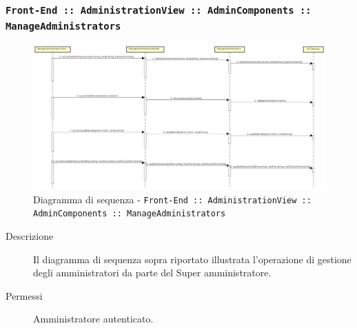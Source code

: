 \documentclass[../DefinizioneDiProdotto.tex]{subfiles}
\begin{document}
		\subsubsection{\texttt{Front-End :: AdministrationView :: AdminComponents :: ManageAdministrators}}
		\begin{figure}[!h]
			\centering
			\includegraphics[width=\textwidth]{DiagrammiSequenza/Front-End/AdministrationView/ManageAdministrators.png}
			\caption{Diagramma di sequenza - \texttt{Front-End :: AdministrationView :: AdminComponents :: ManageAdministrators }}
		\end{figure}
		\begin{description}
			\item [Descrizione] Il diagramma di sequenza sopra riportato illustrata l'operazione di gestione degli amministratori da parte del Super amministratore.
			\item [Permessi] Amministratore autenticato.
		\end{description}

		\newpage
\end{document}
